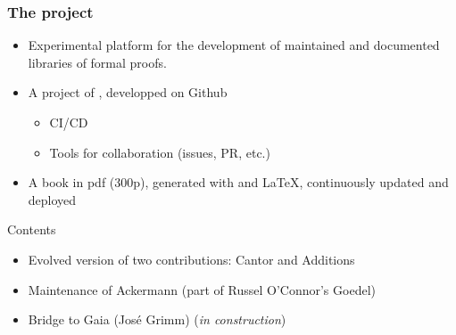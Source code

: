 \documentclass[10pt, fleqn]{beamer}
\begin{document}
\begin{frame}
  \frametitle{The \Hydras project}
  \begin{block}{}
    \begin{itemize}
   \item Experimental platform for the  development of \textcolor{lookcolor}{maintained} and \textcolor{lookcolor}{documented} libraries of formal proofs.
    \item A project of \community, developped on Github
      \begin{itemize}
      \item CI/CD
        \item Tools for collaboration (issues, PR, etc.)
        \end{itemize}
           \item A book in pdf (300p), generated  with \textcolor{lookcolor}{\alectr} and \LaTeX, continuously updated and deployed
    \end{itemize}
  \end{block}
  \begin{block}{Contents}
    \begin{itemize}
    \item Evolved version  of two contributions: \textcolor{plugincolor}{Cantor} and \textcolor{plugincolor}{Additions}
    \item Maintenance of \textcolor{plugincolor}{Ackermann}
      (part of Russel O'Connor's \textcolor{plugincolor}{Goedel})
    \item Bridge to \textcolor{plugincolor}{Gaia} (José Grimm) (\emph{in construction})
   
    \end{itemize}
  \end{block}
 
\end{frame}
\end{document}
